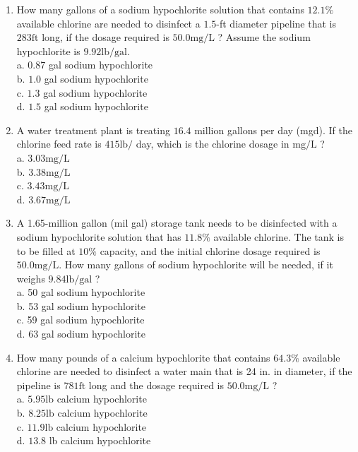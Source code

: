 \documentclass[10pt]{article}
\begin{document}
\begin{enumerate}
  \item How many gallons of a sodium hypochlorite solution that contains $12.1 \%$ available chlorine are needed to disinfect a $1.5$-ft diameter pipeline that is $283 \mathrm{ft}$ long, if the dosage required is $50.0 \mathrm{mg} / \mathrm{L}$ ? Assume the sodium hypochlorite is $9.92 \mathrm{lb} / \mathrm{gal}$.\\
a. $0.87$ gal sodium hypochlorite\\
b. $1.0$ gal sodium hypochlorite\\
c. $1.3$ gal sodium hypochlorite\\
d. $1.5$ gal sodium hypochlorite 

\item A water treatment plant is treating $16.4$ million gallons per day (mgd). If the chlorine feed rate is $415 \mathrm{lb} /$ day, which is the chlorine dosage in $\mathrm{mg} / \mathrm{L}$ ?\\
a. $3.03 \mathrm{mg} / \mathrm{L}$\\
b. $3.38 \mathrm{mg} / \mathrm{L}$\\
c. $3.43 \mathrm{mg} / \mathrm{L}$\\
d. $3.67 \mathrm{mg} / \mathrm{L}$

  \item A 1.65-million gallon (mil gal) storage tank needs to be disinfected with a sodium hypochlorite solution that has $11.8 \%$ available chlorine. The tank is to be filled at $10 \%$ capacity, and the initial chlorine dosage required is $50.0 \mathrm{mg} / \mathrm{L}$. How many gallons of sodium hypochlorite will be needed, if it weighs $9.84 \mathrm{lb} / \mathrm{gal}$ ?\\
a. 50 gal sodium hypochlorite\\
b. 53 gal sodium hypochlorite\\
c. 59 gal sodium hypochlorite\\
d. 63 gal sodium hypochlorite

  \item How many pounds of a calcium hypochlorite that contains $64.3 \%$ available chlorine are needed to disinfect a water main that is 24 in. in diameter, if the pipeline is $781 \mathrm{ft}$ long and the dosage required is $50.0 \mathrm{mg} / \mathrm{L}$ ?\\
a. $5.95 \mathrm{lb}$ calcium hypochlorite\\
b. $8.25 \mathrm{lb}$ calcium hypochlorite\\
c. $11.9 \mathrm{lb}$ calcium hypochlorite\\
d. $13.8$ lb calcium hypochlorite


\end{enumerate}
\end{document}
